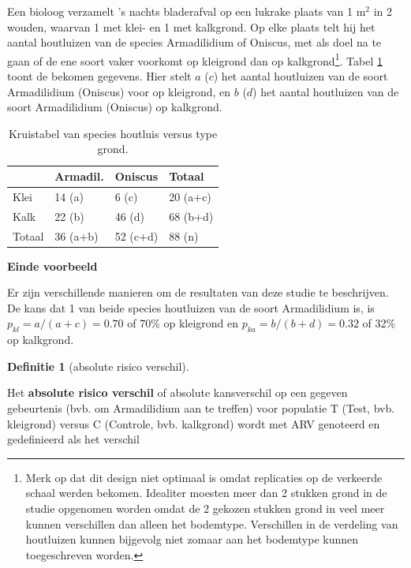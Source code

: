 \documentclass[
  12pt,dutch]{book}
\theoremstyle{definition}
\newtheorem{definition}{Definitie}[chapter]
\theoremstyle{definition}
\theoremstyle{definition}
\theoremstyle{definition}
\theoremstyle{remark}
\begin{document}
Een bioloog verzamelt 's nachts bladerafval op een lukrake plaats van 1 m\(^2\)
in 2 wouden, waarvan 1 met klei- en 1 met kalkgrond. Op elke plaats telt hij het aantal houtluizen van de species
Armadilidium of Oniscus, met als doel na te gaan of de ene soort vaker voorkomt op kleigrond dan op
kalkgrond\footnote{Merk op dat dit design niet optimaal is omdat replicaties op de verkeerde schaal werden bekomen. Idealiter moesten meer dan 2 stukken grond in de studie opgenomen worden omdat de 2 gekozen stukken grond in veel meer kunnen verschillen dan alleen het bodemtype. Verschillen in de verdeling van houtluizen kunnen bijgevolg niet zomaar aan het bodemtype kunnen toegeschreven worden.}. Tabel \ref{tab:cox} toont de bekomen gegevens. Hier stelt \(a\) (\(c\)) het aantal houtluizen van de soort Armadilidium (Oniscus) voor op kleigrond, en \(b\) (\(d\)) het aantal houtluizen van de soort Armadilidium (Oniscus) op kalkgrond.

\begin{table}

\caption{\label{tab:cox}Kruistabel van species houtluis versus type grond.}
\centering
\begin{tabular}[t]{llll}
\toprule
  & Armadil. & Oniscus & Totaal\\
\midrule
Klei & 14 (a) & 6 (c) & 20 (a+c)\\
Kalk & 22 (b) & 46 (d) & 68 (b+d)\\
Totaal & 36 (a+b) & 52 (c+d) & 88 (n)\\
\bottomrule
\end{tabular}
\end{table}

\textbf{Einde voorbeeld}

Er zijn verschillende manieren om de resultaten van deze studie te
beschrijven. De kans dat 1 van beide species houtluizen van de soort Armadilidium is, is \(p_{kl}=a/(a+c)=0.70\) of 70\% op kleigrond en \(p_{ka}=b/(b+d)=0.32\) of 32\% op kalkgrond.

\begin{definition}[absolute risico verschil]
\protect\hypertarget{def:unnamed-chunk-110}{}\label{def:unnamed-chunk-110}~
\end{definition}

Het \textbf{absolute risico verschil} of absolute kansverschil op een gegeven gebeurtenis (bvb. om Armadilidium aan te treffen) voor populatie T (Test, bvb. kleigrond) versus C (Controle, bvb. kalkgrond) wordt
met ARV genoteerd en gedefinieerd als het verschil
\end{document}
